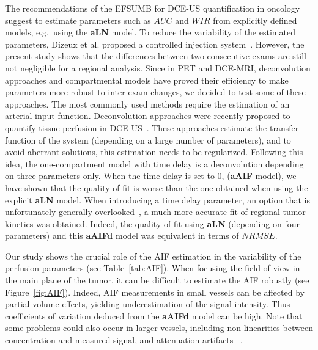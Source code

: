 The recommendations of the EFSUMB for DCE-US quantification in oncology suggest to estimate  parameters such as $AUC$ and $WIR$ from explicitly defined models, e.g.~using the \textbf{aLN} model. To reduce the variability of the estimated parameters, Dizeux et al. proposed a controlled injection system~\cite{Dizeux2016cd}. However, the present study shows that the differences between two consecutive exams are still not negligible for a regional analysis. Since in PET and DCE-MRI, deconvolution approaches and compartmental models have proved their efficiency to make parameters more robust to inter-exam changes, we decided to test some of these approaches. The most commonly used methods require the estimation of an arterial input function. Deconvolution approaches were recently proposed to quantify tissue perfusion in DCE-US~\cite{Gauthier2012vc}. These approaches estimate the transfer function of the system (depending on a large number of parameters), and to avoid aberrant solutions, this estimation needs to be regularized. 
Following this idea, the one-compartment model with time delay is a deconvolution depending on three parameters only. When the time delay is set to 0,  (\textbf{aAIF} model), we have shown that the quality of fit is worse than the one obtained when using the explicit \textbf{aLN} model. 
When introducing a time delay parameter, an option that is unfortunately generally overlooked~\cite{Kudo2009hy}, a much more accurate fit of regional tumor kinetics was obtained. Indeed, the quality of fit using \textbf{aLN} (depending on four parameters) and this  \textbf{aAIFd} model was equivalent in terms of $NRMSE$. 

Our study shows the crucial role of the AIF estimation in the variability of the perfusion parameters (see Table~\ref{tab:AIF}). When focusing the field of view in the main plane of the tumor, it can be difficult to estimate the AIF robustly (see Figure~\ref{fig:AIF}). Indeed, AIF measurements in small vessels can be affected by partial volume effects, yielding underestimation of the signal intensity. Thus coefficients of variation deduced from the \textbf{aAIFd} model can be high. Note that some problems could also occur in larger vessels, including non-linearities between concentration and measured signal, and attenuation artifacts ~\cite{Mule2008ms}.

